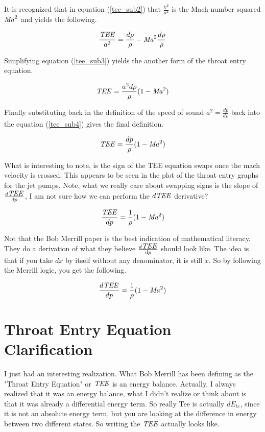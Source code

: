 \documentclass{article}
\newcommand\Mach{\mbox{\textit{Ma}}}  %
\newcommand\Tee{\mbox{\textit{TEE}}}  %
\begin{document}
It is recognized that in equation (\ref{tee_sub2}) that $\frac{V^2}{a^2}$ is the Mach number squared $\Mach^2$ and yields the following.

\begin{equation}
\frac{\Tee}{a^2} = \frac{d\rho}{\rho} - \Mach^2\frac{d\rho}{\rho}
\label{tee_sub3} 
\end{equation}

Simplifying equation (\ref{tee_sub3}) yields the another form of the throat entry equation.

\begin{equation}
    \Tee = \frac{a^2d\rho}{\rho}(1 - \Mach^2)
\label{tee_sub4}    
\end{equation}

Finally substituting back in the definition of the speed of sound $a^2 = \frac{dp}{d\rho}$ back into the equation (\ref{tee_sub4}) gives the final definition.

\begin{equation}
    \Tee = \frac{dp}{\rho}(1 - \Mach^2)
\label{tee_final}    
\end{equation}

What is interesting to note, is the sign of the TEE equation swaps once the mach velocity is crossed. This appears to be seen in the plot of the throat entry graphs for the jet pumps. Note, what we really care about swapping signs is the slope of $\frac{d\Tee}{dp}$, I am not sure how we can perform the $d\Tee$ derivative?

\begin{equation}
\frac{\Tee}{dp} = \frac{1}{\rho}(1 - \Mach^2)
\end{equation}

Not that the Bob Merrill paper \cite{merrill} is the best indication of mathematical literacy. They do a derivation of what they believe $\frac{d\Tee}{dp}$ should look like. The idea is that if you take $dx$ by itself without any denominator, it is still $x$. So by following the Merrill logic, you get the following.

\begin{equation}
    \frac{d\Tee}{dp} = \frac{1}{\rho}(1 - \Mach^2)
\end{equation}

\section{Throat Entry Equation Clarification}

I just had an interesting realization. What Bob Merrill has been defining as the "Throat Entry Equation" or $\Tee$ is an energy balance. Actually, I always realized that it was an energy balance, what I didn't realize or think about is that it was already a differential energy term. So really Tee is actually $dE_{te}$, since it is not an absolute energy term, but you are looking at the difference in energy between two different states. So writing the $\Tee$ actually looks like.
\end{document}
